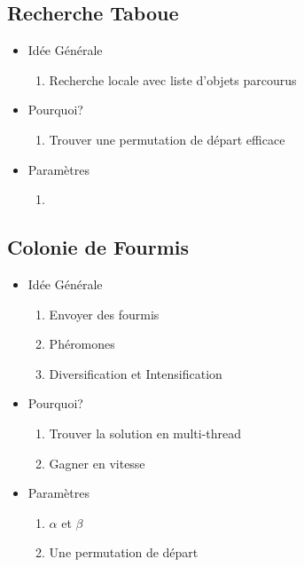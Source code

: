 \documentclass[b]{beamer}
\begin{document}
\subsection{Recherche Taboue}

\begin{frame}

	\begin{itemize}
		\item Idée Générale\\
		\begin{enumerate}
			\item Recherche locale avec liste d'objets parcourus 
		\end{enumerate}
		\item Pourquoi?\\
		\begin{enumerate}
			\item Trouver une permutation de départ efficace
		\end{enumerate}
		\item Paramètres
		\begin{enumerate}
			\item
		\end{enumerate}
	\end{itemize}

\end{frame}

\subsection{Colonie de Fourmis}

\begin{frame}

	\begin{itemize}
		\item Idée Générale\\
		\begin{enumerate}
			\item Envoyer des fourmis
			\item Phéromones\\
			\item Diversification et Intensification\\ 
		\end{enumerate}
		\item Pourquoi?\\
		\begin{enumerate}
			\item Trouver la solution en multi-thread
			\item Gagner en vitesse
		\end{enumerate}
		\item Paramètres
		\begin{enumerate}
			\item $\alpha$ et $\beta$
			\item Une permutation de départ
		\end{enumerate}
	\end{itemize}
\end{frame}
\end{document}
